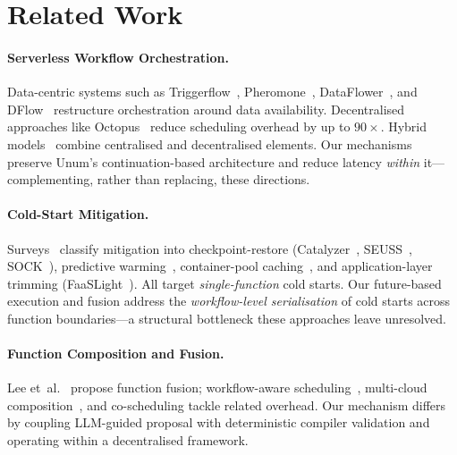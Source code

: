 \documentclass[runningheads]{llncs}
\begin{document}
\section{Related Work}
\label{sec:related_work}

\paragraph{Serverless Workflow Orchestration.}
Data-centric systems such as Triggerflow~\cite{Arjona_2021}, Pheromone~\cite{285113,yu2025pheromone}, DataFlower~\cite{li2023dataflowerexploitingdataflowparadigm}, and DFlow~\cite{shi2023dflowefficientdataflowbasedinvocation} restructure orchestration around data availability. Decentralised approaches like Octopus~\cite{wang2025octopus} reduce scheduling overhead by up to $90\times$. Hybrid models~\cite{zhang2025federated,filinis2024intent} combine centralised and decentralised elements. Our mechanisms preserve Unum's continuation-based architecture and reduce latency \emph{within} it---complementing, rather than replacing, these directions.

\paragraph{Cold-Start Mitigation.}
Surveys~\cite{ebrahimi2024coldstart,golec2023coldstart} classify mitigation into checkpoint-restore (Catalyzer~\cite{du2020catalyzer}, SEUSS~\cite{cadden2020seuss}, SOCK~\cite{oakes2018sock}), predictive warming~\cite{vahidinia2023rl,hu2024predictive}, container-pool caching~\cite{fuerst2021faascache,yu2024rainbowcake}, and application-layer trimming (FaaSLight~\cite{liu2022faaslight}). All target \emph{single-function} cold starts. Our future-based execution and fusion address the \emph{workflow-level serialisation} of cold starts across function boundaries---a structural bottleneck these approaches leave unresolved.

\paragraph{Function Composition and Fusion.}
Lee et~al.~\cite{lee2021fusion} propose function fusion; workflow-aware scheduling~\cite{pan2024sustainable,quinn2021implications}, multi-cloud composition~\cite{elshamy2023orchestration,ristov2020afcl}, and co-schedu\-ling \cite{liu2025jointlambda} tackle related overhead. Our mechanism differs by coupling LLM-guided proposal with deterministic compiler validation and operating within a decentralised framework.
\end{document}
